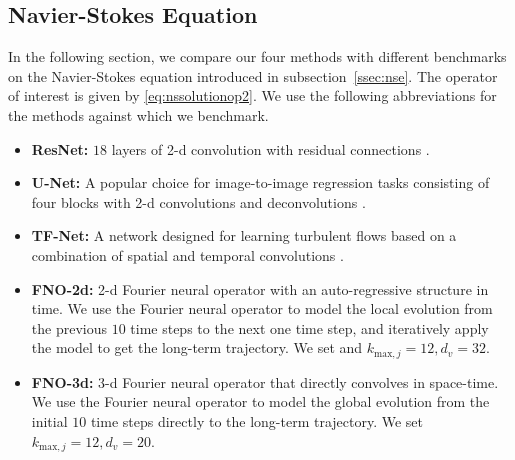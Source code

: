 

\subsection{Navier-Stokes Equation}
\label{ssec:result_nse}


In the following section, we compare our four methods with different benchmarks on the Navier-Stokes equation introduced in subsection~\ref{ssec:nse}. The operator of interest is given by \eqref{eq:nssolutionop2}. We use the following abbreviations for the methods against which we benchmark.

\begin{itemize}
    \item {\bf ResNet:} $18$ layers of 2-d convolution with residual connections \cite{he2016deep}.
    \item {\bf U-Net:} A popular choice for image-to-image regression tasks consisting of four blocks with 2-d convolutions and deconvolutions \cite{ronneberger2015u}.
    \item {\bf TF-Net:} A network designed for learning turbulent flows based on a combination of spatial and temporal convolutions \cite{wang2020towards}.
    \item {\bf FNO-2d:} 2-d Fourier neural operator with an auto-regressive structure in time. We use the Fourier neural operator to model the local evolution from the previous $10$ time steps to the next one time step, and iteratively apply the model to get the long-term trajectory. We set and $k_{\text{max},j} = 12, d_v=32$.
    \item {\bf FNO-3d:} 3-d Fourier neural operator that directly convolves in space-time. We use the Fourier neural operator to model the global evolution from the initial $10$ time steps  directly to the long-term trajectory. We set  $k_{\text{max},j} = 12, d_v=20$.
\end{itemize}
   
